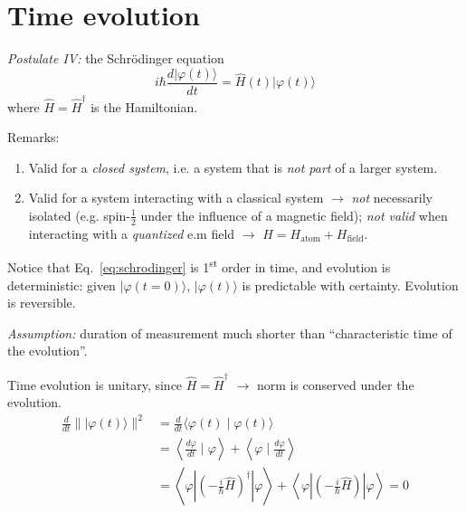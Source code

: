\documentclass[12pt]{article}
\begin{document}
\section{Time evolution}

\emph{Postulate IV:} the Schrödinger equation
\begin{equation}
\boxed{
i \hbar \frac{d|\varphi(t)\rangle}{d t} = 
\hat{H}(t) |\varphi(t)\rangle
}
\label{eq:schrodinger}
\end{equation}
where $\hat{H} = \hat{H}^{\dagger}$ is the Hamiltonian.

Remarks:
\begin{enumerate}
\item Valid for a \emph{closed system}, i.e. a system that is \emph{not part} of a larger system.
\item Valid for a system interacting with a classical 
system $\to$ \emph{not} necessarily isolated (e.g. spin-$\frac{1}{2}$
under the influence of a magnetic field);
\emph{not valid} when interacting with a \emph{quantized}
e.m field $\to$ $H = H_\textrm{atom} + H_\textrm{field}$. 
\end{enumerate}

Notice that Eq.~\ref{eq:schrodinger} is 1\textsuperscript{st} order in time, and evolution is deterministic: given \mbox{$|\varphi(t=0)\rangle$}, $|\varphi(t)\rangle$ is predictable with certainty. Evolution is reversible.

\bigskip

\emph{Assumption:} duration of measurement much shorter
than ``characteristic time of the evolution''.

Time evolution is unitary, since $\hat{H} = \hat{H}^{\dagger}$ $\to$ norm is conserved under the evolution.
\begin{equation}
\begin{aligned} \frac{d}{d t} \||\varphi(t)\rangle \|^{2} &=\frac{d}{d t}\langle\varphi(t) \mid \varphi(t)\rangle \\ &=\left\langle\frac{d \varphi}{d t} \mid \varphi\right\rangle+\left\langle\varphi \mid \frac{d \varphi}{d t}\right\rangle\\
&=\left\langle\varphi \left|\left(-\frac{i}{\hbar} \hat{H}\right)^{\dagger}\right|\varphi\right\rangle+\left\langle\varphi\left|\left(-\frac{i}{\hbar} \hat{H}\right)\right| \varphi\right\rangle
=0
\end{aligned}
\end{equation}
\end{document}
